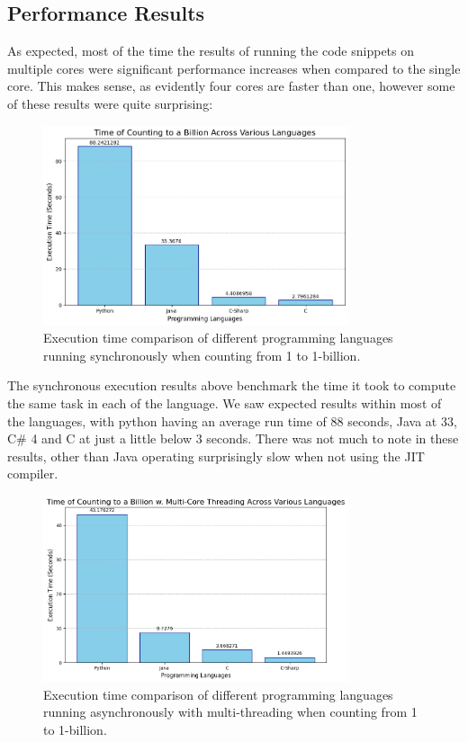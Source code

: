 \documentclass[12pt,a4paper]{article}
\begin{document}
\subsection{Performance Results}

As expected, most of the time the results of running the code snippets on multiple cores were significant performance increases when compared to the single core. This makes sense, as evidently four cores are faster than one, however some of these results were quite surprising:

\begin{figure}[H]
    \centering
    \includegraphics[width=0.8\textwidth]{../sync_records/sync_exec_times.png}
    \captionsetup{font=small, justification=centering}
    \caption{Execution time comparison of different programming languages running synchronously when counting from 1 to 1-billion.}
    \label{fig:sync-exec-times}
\end{figure}

The synchronous execution results above benchmark the time it took to compute the same task in each of the language. We saw expected results within most of the languages, with python having an average run time of 88 seconds, Java at 33, C\# 4 and C at just a little below 3 seconds. There was not much to note in these results, other than Java operating surprisingly slow when not using the JIT compiler.

\begin{figure}[H]
    \centering
    \includegraphics[width=0.8\textwidth]{../async_records/async_exec_times.png}
    \captionsetup{font=small, justification=centering}
    \caption{Execution time comparison of different programming languages running asynchronously with multi-threading when counting from 1 to 1-billion.}
    \label{fig:async-exec-times}
\end{figure}
\end{document}
